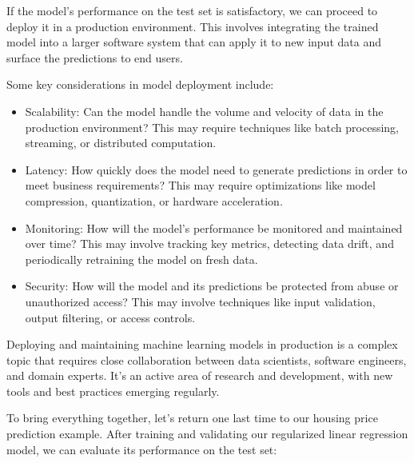 \documentclass[
  9pt,
  letterpaper,
  abstract,
  titlepage]{scrbook}
\begin{document}
If the model's performance on the test set is satisfactory, we can
proceed to deploy it in a production environment. This involves
integrating the trained model into a larger software system that can
apply it to new input data and surface the predictions to end users.

Some key considerations in model deployment include:

\begin{itemize}
\item
  Scalability: Can the model handle the volume and velocity of data in
  the production environment? This may require techniques like batch
  processing, streaming, or distributed computation.
\item
  Latency: How quickly does the model need to generate predictions in
  order to meet business requirements? This may require optimizations
  like model compression, quantization, or hardware acceleration.
\item
  Monitoring: How will the model's performance be monitored and
  maintained over time? This may involve tracking key metrics, detecting
  data drift, and periodically retraining the model on fresh data.
\item
  Security: How will the model and its predictions be protected from
  abuse or unauthorized access? This may involve techniques like input
  validation, output filtering, or access controls.
\end{itemize}

Deploying and maintaining machine learning models in production is a
complex topic that requires close collaboration between data scientists,
software engineers, and domain experts. It's an active area of research
and development, with new tools and best practices emerging regularly.

To bring everything together, let's return one last time to our housing
price prediction example. After training and validating our regularized
linear regression model, we can evaluate its performance on the test
set:
\end{document}
